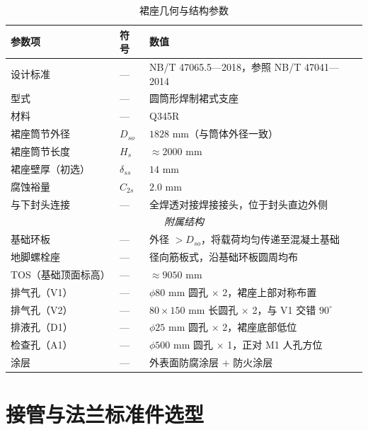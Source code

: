 \begin{table}[htbp]
  \centering
  \caption{裙座几何与结构参数}
  \label{tab:cad-skirt}
  \small\renewcommand{\arraystretch}{1.15}
  \setlength{\tabcolsep}{10pt}
  \begin{tabularx}{\textwidth}{@{}l l l @{}}
    \toprule
    \textbf{参数项} & \textbf{符号} & \textbf{数值} \\
    \midrule
    设计标准                & —        & NB/T 47065.5—2018，参照 NB/T 47041—2014 \\
    型式                    & —        & 圆筒形焊制裙式支座 \\
    材料                    & —        & Q345R \\
    裙座筒节外径            & $D_{so}$ & $1828$ mm（与筒体外径一致） \\
    裙座筒节长度            & $H_s$    & $\approx 2000$ mm \\
    裙座壁厚（初选）        & $\delta_{ss}$ & $14$ mm \\
    腐蚀裕量                & $C_{2s}$ & $2.0$ mm \\
    与下封头连接            & —        & 全焊透对接焊接接头，位于封头直边外侧 \\
    \midrule
    \multicolumn{3}{c}{\textit{附属结构}} \\
    基础环板                & —        & 外径 $> D_{so}$，将载荷均匀传递至混凝土基础 \\
    地脚螺栓座              & —        & 径向筋板式，沿基础环板圆周均布 \\
    TOS（基础顶面标高）     & —        & $\approx 9050$ mm \\
    排气孔（V1）            & —        & $\phi 80$ mm 圆孔 $\times$ 2，裙座上部对称布置 \\
    排气孔（V2）            & —        & $80 \times 150$ mm 长圆孔 $\times$ 2，与 V1 交错 $90^\circ$ \\
    排液孔（D1）            & —        & $\phi 25$ mm 圆孔 $\times$ 2，裙座底部低位 \\
    检查孔（A1）            & —        & $\phi 500$ mm 圆孔 $\times$ 1，正对 M1 人孔方位 \\
    涂层                    & —        & 外表面防腐涂层 + 防火涂层 \\
    \bottomrule
  \end{tabularx}
\end{table}

\section{接管与法兰标准件选型}
\label{sec:cad-nozzles}

